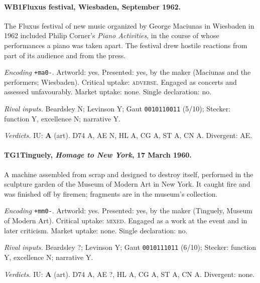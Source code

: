 \paragraph{WB1\enspace Fluxus festival, Wiesbaden, September 1962.}
The Fluxus festival of new music organized by George Maciunas in Wiesbaden in 1962 included Philip Corner's \emph{Piano Activities}, in the course of whose performances a piano was taken apart. The festival drew hostile reactions from part of its audience and from the press.\par
\noindent\textit{Encoding} \texttt{+ma0-}. Artworld: yes. Presented: yes, by the maker (Maciunas and the performers; Wiesbaden). Critical uptake: \textsc{adverse}. Engaged as concerts and assessed unfavourably. Market uptake: none. Single declaration: no.\par
\noindent\textit{Rival inputs.} Beardsley N; Levinson Y; Gaut \texttt{0010110011} (5/10); Stecker: function Y, excellence N; narrative Y.\par
\noindent\textit{Verdicts.} IU: \textbf{A} (art). D74 A, AE N, HL A, CG A, ST A, CN A. Divergent: AE.\par

\paragraph{TG1\enspace Tinguely, \emph{Homage to New York}, 17 March 1960.}
A machine assembled from scrap and designed to destroy itself, performed in the sculpture garden of the Museum of Modern Art in New York. It caught fire and was finished off by firemen; fragments are in the museum's collection.\par
\noindent\textit{Encoding} \texttt{+mm0-}. Artworld: yes. Presented: yes, by the maker (Tinguely, Museum of Modern Art). Critical uptake: \textsc{mixed}. Engaged as a work at the event and in later criticism. Market uptake: none. Single declaration: no.\par
\noindent\textit{Rival inputs.} Beardsley ?; Levinson Y; Gaut \texttt{0010111011} (6/10); Stecker: function Y, excellence N; narrative Y.\par
\noindent\textit{Verdicts.} IU: \textbf{A} (art). D74 A, AE ?, HL A, CG A, ST A, CN A. Divergent: none.\par

